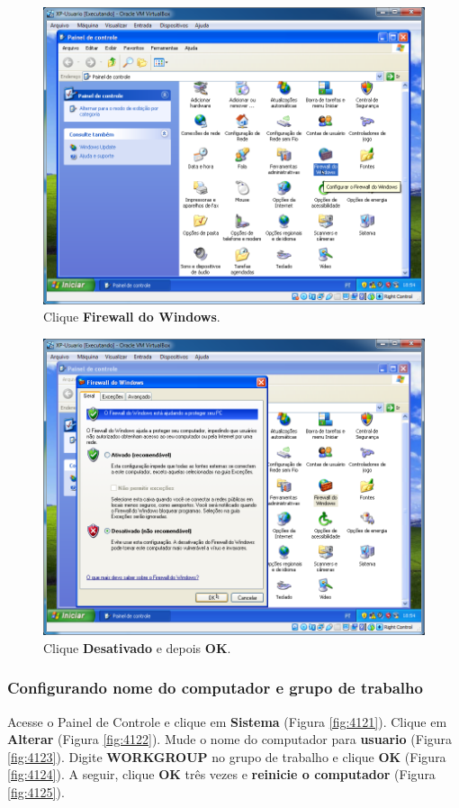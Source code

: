 \documentclass[10pt]{article}
\begin{document}
\begin{figure}[H]
    \centering
    \caption{Clique \textbf{Firewall do Windows}.}
    \label{fig:4112}
    \includegraphics[width=\linewidth]{images/xp_rede/002.png}
\end{figure}

\begin{figure}[H]
    \centering
    \caption{Clique \textbf{Desativado} e depois \textbf{OK}.}
    \label{fig:4113}
    \includegraphics[width=\linewidth]{images/xp_rede/003.png}
\end{figure}


\subsubsection{Configurando nome do computador e grupo de trabalho}
\par Acesse o Painel de Controle e clique em \textbf{Sistema} (Figura \ref{fig:4121}). Clique em \textbf{Alterar} (Figura \ref{fig:4122}). 
Mude o nome do computador para \textbf{usuario} (Figura \ref{fig:4123}). Digite \textbf{WORKGROUP} no grupo de trabalho e clique \textbf{OK} (Figura \ref{fig:4124}). A seguir, clique \textbf{OK} três vezes e \textbf{reinicie o computador} (Figura \ref{fig:4125}).
\end{document}
